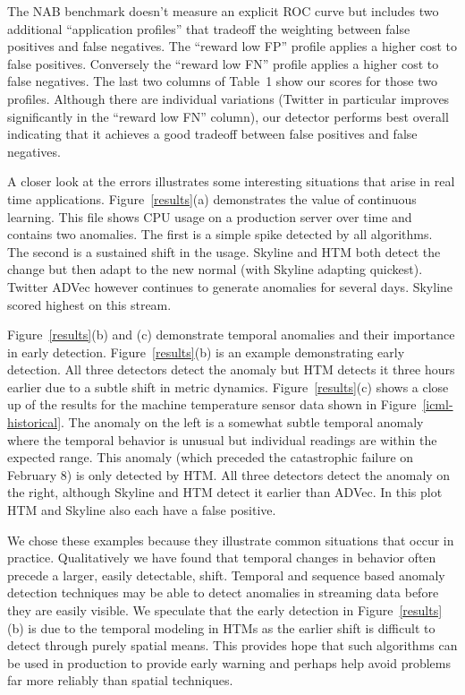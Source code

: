 \documentclass{article}
\begin{document}
The NAB benchmark doesn't measure an explicit ROC curve but includes two
additional ``application profiles'' that tradeoff the weighting between false
positives and false negatives. The ``reward low FP'' profile applies a higher cost
to false positives. Conversely the ``reward low FN'' profile applies a higher cost
to false negatives. The last two columns of Table~1 show our
scores for those two profiles. Although there are individual variations (Twitter
in particular improves significantly in the ``reward low FN'' column), our
detector performs best overall indicating that it achieves a good tradeoff
between false positives and false negatives.

A closer look at the errors illustrates some interesting situations
that arise in real time applications.
Figure~\ref{results}(a) demonstrates the value of continuous learning. This file
shows CPU usage on a production server over time and contains two anomalies. The
first is a simple spike detected by all algorithms. The second is a sustained
shift in the usage. Skyline and HTM both detect the change but then adapt to the
new normal (with Skyline adapting quickest). Twitter ADVec however continues to
generate anomalies for several days.  Skyline scored highest on this stream.

Figure~\ref{results}(b) and (c) demonstrate temporal anomalies and their
importance in early detection. Figure~\ref{results}(b) is an example
demonstrating early detection. All three detectors detect the anomaly but HTM
detects it three hours earlier due to a subtle shift in metric dynamics.
Figure~\ref{results}(c) shows a close up of the results for the machine temperature
sensor data shown in Figure~\ref{icml-historical}. The anomaly on the left is a
somewhat subtle temporal anomaly where the temporal behavior is unusual but
individual readings are within the expected range. This anomaly (which preceded
the catastrophic failure on February 8) is only detected by HTM.  All three
detectors detect the anomaly on the right, although Skyline and HTM detect it
earlier than ADVec. In this plot HTM and Skyline also each have a false
positive.

We chose these examples because they illustrate common situations that occur in
practice. Qualitatively we have found that temporal changes in behavior often
precede a larger, easily detectable, shift. Temporal and sequence based anomaly
detection techniques may be able to detect anomalies in streaming data before
they are easily visible. We speculate that the early detection in
Figure~\ref{results}(b) is due to the temporal modeling in HTMs as the earlier
shift is difficult to detect through purely spatial means. This provides hope
that such algorithms can be used in production to provide early warning and
perhaps help avoid problems far more reliably than spatial techniques.
\end{document}
